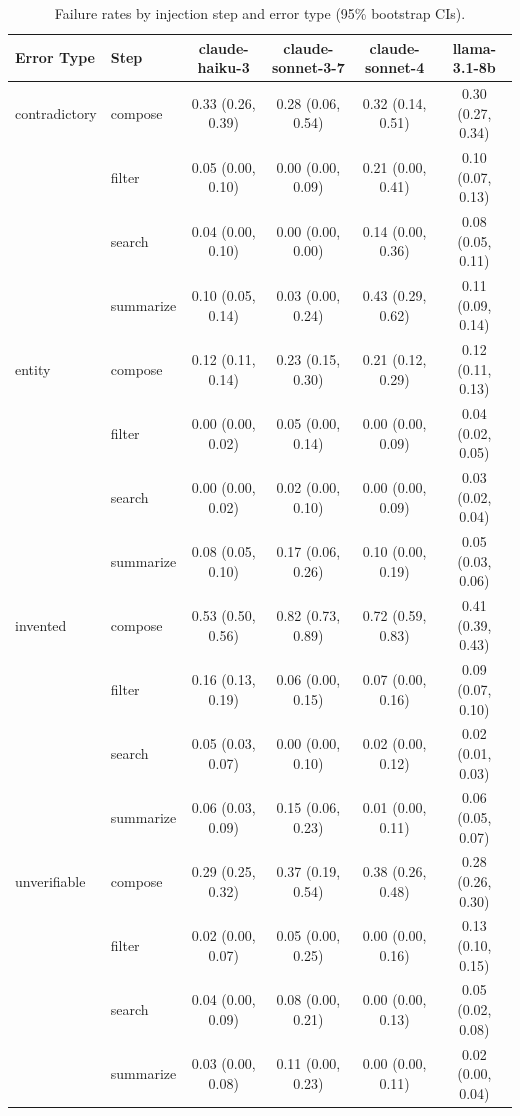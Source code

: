 \begin{table}[t]
\centering
\caption{Failure rates by injection step and error type (95\% bootstrap CIs).}
\label{tab:propagation}
\begin{tabular}{llcccc}
\toprule
Error Type & Step & claude-haiku-3 & claude-sonnet-3-7 & claude-sonnet-4 & llama-3.1-8b \\
\midrule
contradictory & compose & 0.33 (0.26, 0.39) & 0.28 (0.06, 0.54) & 0.32 (0.14, 0.51) & 0.30 (0.27, 0.34) \\
 & filter & 0.05 (0.00, 0.10) & 0.00 (0.00, 0.09) & 0.21 (0.00, 0.41) & 0.10 (0.07, 0.13) \\
 & search & 0.04 (0.00, 0.10) & 0.00 (0.00, 0.00) & 0.14 (0.00, 0.36) & 0.08 (0.05, 0.11) \\
 & summarize & 0.10 (0.05, 0.14) & 0.03 (0.00, 0.24) & 0.43 (0.29, 0.62) & 0.11 (0.09, 0.14) \\
entity & compose & 0.12 (0.11, 0.14) & 0.23 (0.15, 0.30) & 0.21 (0.12, 0.29) & 0.12 (0.11, 0.13) \\
 & filter & 0.00 (0.00, 0.02) & 0.05 (0.00, 0.14) & 0.00 (0.00, 0.09) & 0.04 (0.02, 0.05) \\
 & search & 0.00 (0.00, 0.02) & 0.02 (0.00, 0.10) & 0.00 (0.00, 0.09) & 0.03 (0.02, 0.04) \\
 & summarize & 0.08 (0.05, 0.10) & 0.17 (0.06, 0.26) & 0.10 (0.00, 0.19) & 0.05 (0.03, 0.06) \\
invented & compose & 0.53 (0.50, 0.56) & 0.82 (0.73, 0.89) & 0.72 (0.59, 0.83) & 0.41 (0.39, 0.43) \\
 & filter & 0.16 (0.13, 0.19) & 0.06 (0.00, 0.15) & 0.07 (0.00, 0.16) & 0.09 (0.07, 0.10) \\
 & search & 0.05 (0.03, 0.07) & 0.00 (0.00, 0.10) & 0.02 (0.00, 0.12) & 0.02 (0.01, 0.03) \\
 & summarize & 0.06 (0.03, 0.09) & 0.15 (0.06, 0.23) & 0.01 (0.00, 0.11) & 0.06 (0.05, 0.07) \\
unverifiable & compose & 0.29 (0.25, 0.32) & 0.37 (0.19, 0.54) & 0.38 (0.26, 0.48) & 0.28 (0.26, 0.30) \\
 & filter & 0.02 (0.00, 0.07) & 0.05 (0.00, 0.25) & 0.00 (0.00, 0.16) & 0.13 (0.10, 0.15) \\
 & search & 0.04 (0.00, 0.09) & 0.08 (0.00, 0.21) & 0.00 (0.00, 0.13) & 0.05 (0.02, 0.08) \\
 & summarize & 0.03 (0.00, 0.08) & 0.11 (0.00, 0.23) & 0.00 (0.00, 0.11) & 0.02 (0.00, 0.04) \\
\bottomrule
\end{tabular}
\end{table}